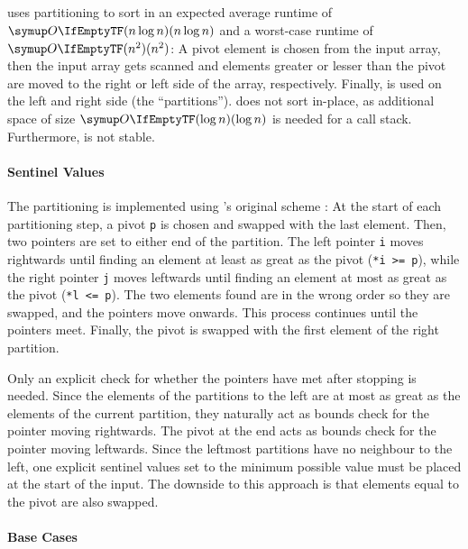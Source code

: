 \subsection{\texorpdfstring{\QS{}}{QuickSort}}
\label{subsec:tasklet:quick}

\QS{} \cite{hoare1962quicksort} uses partitioning to sort in an expected average runtime of \(\bigoh{n \log n}\) and a worst-case runtime of \(\bigoh{n^2}\):
A pivot element is chosen from the input array, then the input array gets scanned and elements greater or lesser than the pivot are moved to the right or left side of the array, respectively.
Finally, \QS{} is used on the left and right side (the \enquote{partitions}).
\QS{} does not sort in-place, as additional space of size \(\bigoh{\log n}\) is needed for a call stack.
Furthermore, \QS{} is not stable.


\paragraph{Sentinel Values}
The partitioning is implemented using \citeauthor{hoare1962quicksort}'s original scheme \cite{hoare1962quicksort}:
At the start of each partitioning step, a pivot \lstinline|p| is chosen and swapped with the last element.
Then, two pointers are set to either end of the partition.
The left pointer \lstinline|i| moves rightwards until finding an element at least as great as the pivot (\lstinline|*i >= p|), while the right pointer \lstinline|j| moves leftwards until finding an element at most as great as the pivot (\lstinline|*l <= p|).
The two elements found are in the wrong order so they are swapped, and the pointers move onwards.
This process continues until the pointers meet.
Finally, the pivot is swapped with the first element of the right partition.

Only an explicit check for whether the pointers have met after stopping is needed.
Since the elements of the partitions to the left are at most as great as the elements of the current partition, they naturally act as bounds check for the pointer moving rightwards.
The pivot at the end acts as bounds check for the pointer moving leftwards.
Since the leftmost partitions have no neighbour to the left, one explicit sentinel values set to the minimum possible value must be placed at the start of the input.
The downside to this approach is that elements equal to the pivot are also swapped.

\paragraph{Base Cases}

